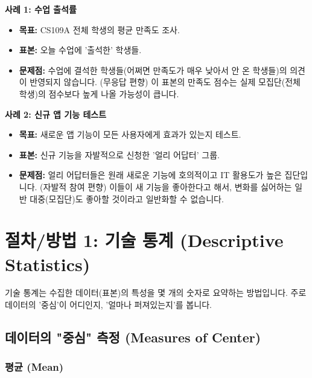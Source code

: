 \documentclass[11pt,a4paper]{book}
\theoremstyle{definition}
\begin{document}
\begin{examplebox}[title={잘못된 표본 추출 예시}]
\textbf{사례 1: 수업 출석률}
\begin{itemize}
    \item \textbf{목표:} CS109A 전체 학생의 평균 만족도 조사.
    \item \textbf{표본:} 오늘 수업에 '출석한' 학생들.
    \item \textbf{문제점:} 수업에 결석한 학생들(어쩌면 만족도가 매우 낮아서 안 온 학생들)의 의견이 반영되지 않습니다. (무응답 편향)
    이 표본의 만족도 점수는 실제 모집단(전체 학생)의 점수보다 높게 나올 가능성이 큽니다.
\end{itemize}

\textbf{사례 2: 신규 앱 기능 테스트}
\begin{itemize}
    \item \textbf{목표:} 새로운 앱 기능이 모든 사용자에게 효과가 있는지 테스트.
    \item \textbf{표본:} 신규 기능을 자발적으로 신청한 '얼리 어답터' 그룹.
    \item \textbf{문제점:} 얼리 어답터들은 원래 새로운 기능에 호의적이고 IT 활용도가 높은 집단입니다. (자발적 참여 편향)
    이들이 새 기능을 좋아한다고 해서, 변화를 싫어하는 일반 대중(모집단)도 좋아할 것이라고 일반화할 수 없습니다.
\end{itemize}
\end{examplebox}


\section{절차/방법 1: 기술 통계 (Descriptive Statistics)}

기술 통계는 수집한 데이터(표본)의 특성을 몇 개의 숫자로 요약하는 방법입니다.
주로 데이터의 '중심'이 어디인지, '얼마나 퍼져있는지'를 봅니다.

\subsection{데이터의 "중심" 측정 (Measures of Center)}

\subsubsection{평균 (Mean)}
\end{document}
